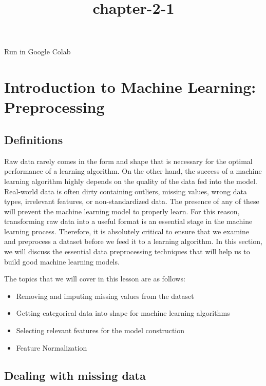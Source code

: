 \documentclass[11pt]{article}
\title{chapter-2-1}
\providecommand{\tightlist}{%
      \setlength{\itemsep}{0pt}\setlength{\parskip}{0pt}}
\begin{document}
    
    \maketitle
    
    

    
    Run in Google Colab

    \hypertarget{introduction-to-machine-learning-preprocessing}{%
\section{Introduction to Machine Learning:
Preprocessing}\label{introduction-to-machine-learning-preprocessing}}

    \hypertarget{definitions}{%
\subsection{Definitions}\label{definitions}}

Raw data rarely comes in the form and shape that is necessary for the
optimal performance of a learning algorithm. On the other hand, the
success of a machine learning algorithm highly depends on the quality of
the data fed into the model. Real-world data is often dirty containing
outliers, missing values, wrong data types, irrelevant features, or
non-standardized data. The presence of any of these will prevent the
machine learning model to properly learn. For this reason, transforming
raw data into a useful format is an essential stage in the machine
learning process. Therefore, it is absolutely critical to ensure that we
examine and preprocess a dataset before we feed it to a learning
algorithm. In this section, we will discuss the essential data
preprocessing techniques that will help us to build good machine
learning models.

The topics that we will cover in this lesson are as follows:

\begin{itemize}
\tightlist
\item
  Removing and imputing missing values from the dataset
\item
  Getting categorical data into shape for machine learning algorithms
\item
  Selecting relevant features for the model construction
\item
  Feature Normalization
\end{itemize}

    \hypertarget{dealing-with-missing-data}{%
\subsection{Dealing with missing data}\label{dealing-with-missing-data}}
\end{document}
